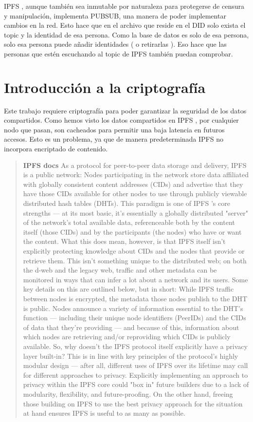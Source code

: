 IPFS \cite{web:ipfs}, aunque también sea inmutable por naturaleza para protegerse de censura y manipulación, implementa PUBSUB, una manera de poder implementar cambios en la red. 
Esto hace que en el archivo que reside en el DID solo exista el topic y la identidad de esa persona. Como la base de datos es solo de esa persona, solo esa persona puede añadir identidades ( o retirarlas ). Eso hace que las personas que estén escuchando al topic de IPFS \cite{web:ipfs} también puedan comprobar.
\newpage
\section{Introducción a la criptografía}
Este trabajo requiere criptografía para poder garantizar la seguridad de los datos compartidos. Como hemos visto los datos compartidos en IPFS \cite{web:ipfs}, por cualquier nodo que pasan, son cacheados para permitir una baja latencia en futuros accesos. Esto es un problema, ya que de manera predeterminada IPFS \cite{web:ipfs} no incorpora encriptado de contenido.
\begin{quote}
    \textbf{IPFS \cite{web:ipfs} docs}
    As a protocol for peer-to-peer data storage and delivery, IPFS \cite{web:ipfs} is a public network: Nodes participating in the network store data affiliated with globally consistent content addresses (CIDs) and advertise that they have those CIDs available for other nodes to use through publicly viewable distributed hash tables (DHTs). This paradigm is one of IPFS \cite{web:ipfs}'s core strengths — at its most basic, it's essentially a globally distributed "server" of the network's total available data, referenceable both by the content itself (those CIDs) and by the participants (the nodes) who have or want the content.
    What this does mean, however, is that IPFS \cite{web:ipfs} itself isn't explicitly protecting knowledge about CIDs and the nodes that provide or retrieve them. This isn't something unique to the distributed web; on both the d-web and the legacy web, traffic and other metadata can be monitored in ways that can infer a lot about a network and its users. Some key details on this are outlined below, but in short: While IPFS \cite{web:ipfs} traffic between nodes is encrypted, the metadata those nodes publish to the DHT is public. Nodes announce a variety of information essential to the DHT's function — including their unique node identifiers (PeerIDs) and the CIDs of data that they're providing — and because of this, information about which nodes are retrieving and/or reproviding which CIDs is publicly available.
    So, why doesn't the IPFS \cite{web:ipfs} protocol itself explicitly have a privacy layer built-in? This is in line with key principles of the protocol's highly modular design — after all, different uses of IPFS \cite{web:ipfs} over its lifetime may call for different approaches to privacy. Explicitly implementing an approach to privacy within the IPFS \cite{web:ipfs} core could "box in" future builders due to a lack of modularity, flexibility, and future-proofing. On the other hand, freeing those building on IPFS \cite{web:ipfs} to use the best privacy approach for the situation at hand ensures IPFS \cite{web:ipfs} is useful to as many as possible.\cite{web:ipfs_modularity}
\end{quote}
